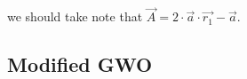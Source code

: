 we should take note that $\vec{A} = 2 \cdot \vec{a} \cdot \vec{r_{1}} - \vec{a}$.

\subsection{Modified GWO}

%
%
%
